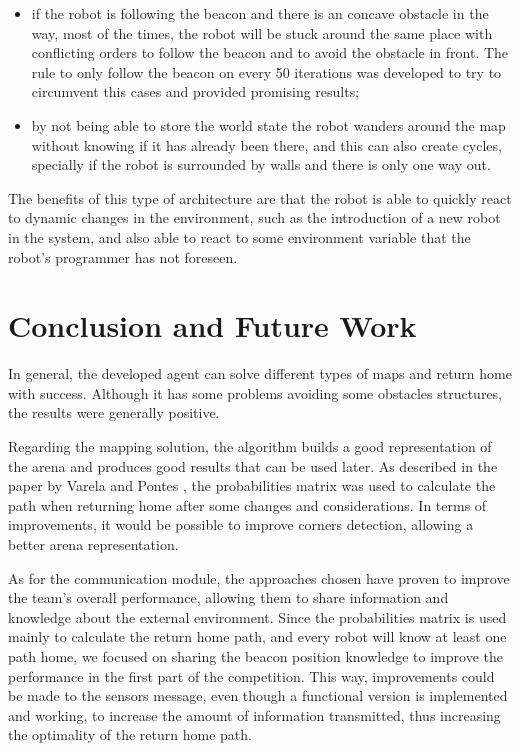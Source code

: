 \documentclass[oribibl]{llncs}
\begin{document}
\begin{itemize}
  \item if the robot is following the beacon and there is an concave obstacle in the way, most of the times, the robot will be stuck around the same place with conflicting orders to follow the beacon and to avoid the obstacle in front. The rule to only follow the beacon on every 50 iterations was developed to try to circumvent this cases and provided promising results;
  \item by not being able to store the world state the robot wanders around the map without knowing if it has already been there, and this can also create cycles, specially if the robot is surrounded by walls and there is only one way out.
\end{itemize}

The benefits of this type of architecture are that the robot is able to quickly react to dynamic changes in the environment, such as the introduction of a new robot in the system, and also able to react to some environment variable that the robot's programmer has not foreseen.

\section{Conclusion and Future Work}

In general, the developed agent can solve different types of maps and return home with success. Although it has some problems avoiding some obstacles structures, the results were generally positive.

Regarding the mapping solution, the algorithm builds a good representation of the arena and produces good results that can be used later. As described in the paper by  Varela and Pontes \cite{varelaepontes}, the probabilities matrix was used to calculate the path when returning home after some changes and considerations. In terms of improvements, it would be possible to improve corners detection, allowing a better arena representation.

As for the communication module, the approaches chosen have proven to improve the team's overall performance, allowing them to share information and knowledge about the external environment. Since the probabilities matrix is used mainly to calculate the return home path, and every robot will know at least one path home, we focused on sharing the beacon position knowledge to improve the performance in the first part of the competition. This way, improvements could be made to the sensors message, even though a functional version is implemented and working, to increase the amount of information transmitted, thus increasing the optimality of the return home path.




\end{document}

